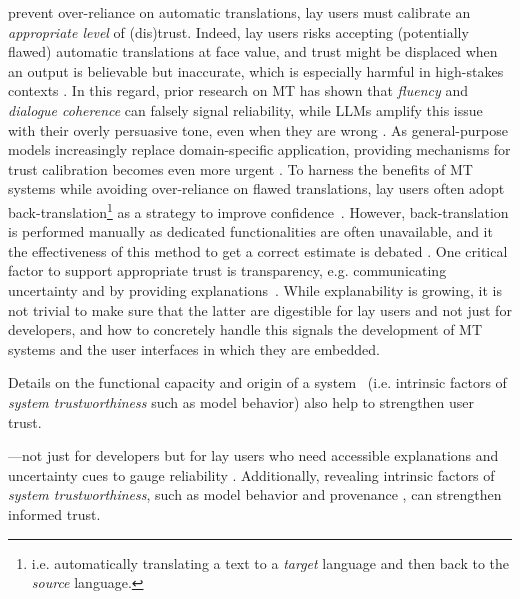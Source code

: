 prevent over-reliance on automatic translations, lay users must calibrate an \emph{appropriate level} of (dis)trust. 
Indeed, lay users risks accepting (potentially flawed) automatic translations at face value, and trust might be displaced when an output is believable but inaccurate, which is especially harmful in high-stakes contexts \citep{mehandru-etal-2023-physician}.  
In this regard, prior research on  MT  has shown that \textit{fluency} and \textit{dialogue coherence} can falsely signal reliability, while LLMs amplify this issue with their overly persuasive tone, even when they are wrong \citep{xiong2024llmsexpressuncertaintyempirical, trust}. 
As general-purpose models increasingly replace domain-specific application, providing mechanisms for trust calibration becomes even more urgent \citep{deng2022generalpurposemachinetranslation, litschko-etal-2023-establishing}. 
To harness the benefits of MT systems while avoiding over-reliance on flawed translations, lay users often adopt 
back-translation\footnote{i.e. automatically translating a text to a \emph{target} language and then back to the \emph{source} language.} as a strategy to improve confidence~\citep{back-2007, zouhar-etal-2021-backtranslation,mehandru-etal-2023-physician}. However, 
back-translation is performed manually as dedicated functionalities are often unavailable, and it the effectiveness of this method to get a correct estimate is debated \citep{robertson2022understanding}. 
One critical factor to support appropriate trust is transparency, e.g. communicating uncertainty and by providing explanations~\citep{liao2023aitransparencyagellms}. While explanability is growing, it is not trivial to make sure that the latter are digestible for lay users and not just for developers, and how to concretely handle this signals 
the development of MT systems and the user interfaces in which they are embedded.




Details on the functional capacity and origin of a system~\citep{davis-1979-applications} (i.e. intrinsic factors of \emph{system trustworthiness} such as model behavior) also help to strengthen user trust.

—not just for developers but for lay users who need accessible explanations and uncertainty cues to gauge reliability \citep{liao2023aitransparencyagellms}. Additionally, revealing intrinsic factors of \emph{system trustworthiness}, such as model behavior and provenance \citep{davis-1979-applications}, can strengthen informed trust.










